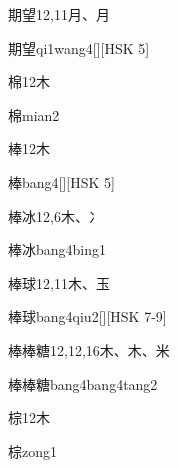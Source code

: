 \begin{Entry}{期望}{12,11}{⽉、⽉}
  \begin{Phonetics}{期望}{qi1wang4}[][HSK 5]
  \end{Phonetics}
\end{Entry}

\begin{Entry}{棉}{12}{⽊}
  \begin{Phonetics}{棉}{mian2}
  \end{Phonetics}
\end{Entry}

\begin{Entry}{棒}{12}{⽊}
  \begin{Phonetics}{棒}{bang4}[][HSK 5]
  \end{Phonetics}
\end{Entry}

\begin{Entry}{棒冰}{12,6}{⽊、⼎}
  \begin{Phonetics}{棒冰}{bang4bing1}
  \end{Phonetics}
\end{Entry}

\begin{Entry}{棒球}{12,11}{⽊、⽟}
  \begin{Phonetics}{棒球}{bang4qiu2}[][HSK 7-9]
  \end{Phonetics}
\end{Entry}

\begin{Entry}{棒棒糖}{12,12,16}{⽊、⽊、⽶}
  \begin{Phonetics}{棒棒糖}{bang4bang4tang2}
  \end{Phonetics}
\end{Entry}

\begin{Entry}{棕}{12}{⽊}
  \begin{Phonetics}{棕}{zong1}
  \end{Phonetics}
\end{Entry}

